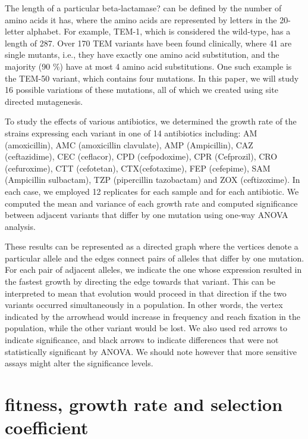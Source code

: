 \documentclass[12pt]{amsart}
\theoremstyle{plain}
\theoremstyle{definition}
\begin{document}
The length of a particular beta-lactamase? can be defined by the number of amino acids it has, where the amino acids are represented by letters in the 20-letter alphabet.   For example, TEM-1, which is considered the wild-type, has a length of 287.  Over 170 TEM variants have been found clinically, where 41 are single mutants, i.e., they have exactly one amino acid substitution, and the majority (90 \%) have at most 4 amino acid substitutions.  One such example is the TEM-50 variant, which contains four mutations.   In this paper, we will study 16 possible variations of these mutations, all of which we created using site directed mutagenesis.

To study the effects of various antibiotics, we determined the growth rate of the strains expressing each variant in one of 14 antibiotics including: AM (amoxicillin), AMC (amoxicillin clavulate), AMP (Ampicillin), CAZ (ceftazidime), CEC (ceflacor), CPD (cefpodoxime), CPR (Cefprozil), CRO (cefuroxime), CTT (cefotetan), CTX(cefotaxime), FEP (cefepime), SAM (Ampicillin sulbactam), TZP (pipercillin tazobactam) and ZOX (ceftizoxime).  In each case, we employed 12 replicates for each sample and for each antibiotic. We computed the mean and variance of each growth rate and computed significance between adjacent variants that differ by one mutation using one-way ANOVA analysis.  

These results can be represented as a directed graph where the vertices denote a particular allele and the edges connect pairs of alleles that differ by one mutation.  For each pair of adjacent alleles, we indicate the one whose expression resulted in the fastest growth by directing the edge towards that variant.  This can be interpreted to mean that evolution would proceed in that direction if the two variants occurred simultaneously in a population.  In other words,  the vertex indicated by the arrowhead would increase in frequency and reach fixation in the population, while the other variant would be lost. We also used red arrows to indicate significance, and black arrows to indicate differences that were not statistically significant by ANOVA.  We should note however that more sensitive assays might alter the significance levels. 

\newpage

\section{fitness, growth rate and selection coefficient}
\end{document}
